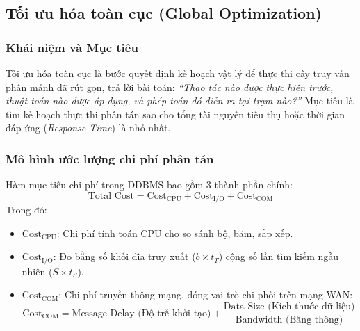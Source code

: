 \documentclass[12pt,a4paper]{report}
\begin{document}
\subsection{Tối ưu hóa toàn cục (Global Optimization)}
\subsubsection{Khái niệm và Mục tiêu}
Tối ưu hóa toàn cục là bước quyết định kế hoạch vật lý để thực thi cây truy vấn phân mảnh đã rút gọn, trả lời bài toán: \textit{``Thao tác nào được thực hiện trước, thuật toán nào được áp dụng, và phép toán đó diễn ra tại trạm nào?''} Mục tiêu là tìm kế hoạch thực thi phân tán sao cho tổng tài nguyên tiêu thụ hoặc thời gian đáp ứng (\textit{Response Time}) là nhỏ nhất.

\subsubsection{Mô hình ước lượng chi phí phân tán}
Hàm mục tiêu chi phí trong DDBMS bao gồm 3 thành phần chính:
\[
\text{Total Cost} = \text{Cost}_{\text{CPU}} + \text{Cost}_{\text{I/O}} + \text{Cost}_{\text{COM}}
\]
Trong đó:
\begin{itemize}[leftmargin=0.8cm, topsep=1pt, itemsep=1pt]
    \item $\text{Cost}_{\text{CPU}}$: Chi phí tính toán CPU cho so sánh bộ, băm, sắp xếp.
    \item $\text{Cost}_{\text{I/O}}$: Đo bằng số khối đĩa truy xuất ($b \times t_T$) cộng số lần tìm kiếm ngẫu nhiên ($S \times t_S$).
    \item $\text{Cost}_{\text{COM}}$: Chi phí truyền thông mạng, đóng vai trò chi phối trên mạng WAN:
    \[\text{Cost}_{\text{COM}} = \text{Message Delay (Độ trễ khởi tạo)} + \frac{\text{Data Size (Kích thước dữ liệu)}}{\text{Bandwidth (Băng thông)}}\]
\end{itemize}
\end{document}
